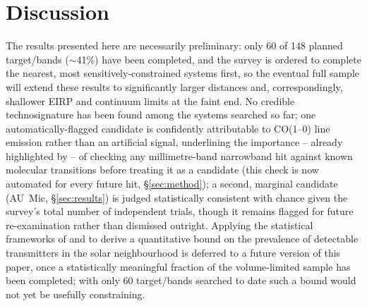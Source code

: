 \documentclass{openjournal}
\begin{document}
\section{Discussion}
\label{sec:discussion}

The results presented here are necessarily preliminary: only 60 of 148
planned target/bands ($\sim$41\%) have been completed, and the survey is
ordered to complete the nearest, most sensitively-constrained systems
first, so the eventual full sample will extend these results to
significantly larger distances and, correspondingly, shallower EIRP and
continuum limits at the faint end. No credible technosignature has been
found among the systems searched so far; one automatically-flagged
candidate is confidently attributable to CO(1--0) line emission rather
than an artificial signal, underlining the importance -- already
highlighted by \citet{Mason2024} -- of checking any millimetre-band
narrowband hit against known molecular transitions before treating it as
a candidate (this check is now automated for every future hit,
\S\ref{sec:method}); a second, marginal candidate (AU~Mic,
\S\ref{sec:results}) is judged statistically consistent with chance
given the survey's total number of independent trials, though it remains
flagged for future re-examination rather than dismissed outright.
Applying the statistical frameworks of
\citet{Wright2018} and \citet{Margot2023} to derive a quantitative bound
on the prevalence of detectable transmitters in the solar neighbourhood
is deferred to a future version of this paper, once a statistically
meaningful fraction of the volume-limited sample has been completed;
with only 60 target/bands searched to date such a bound would not yet be
usefully constraining.
\end{document}
